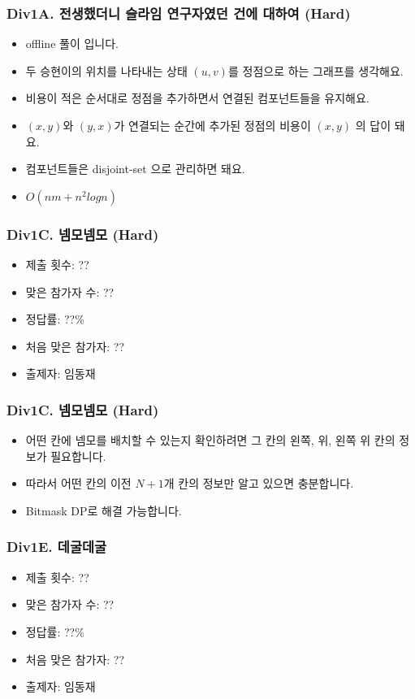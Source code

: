 \documentclass[xetex]{beamer}
\begin{document}
\begin{frame}
  \frametitle{Div1A. 전생했더니 슬라임 연구자였던 건에 대하여 (Hard)}
  \begin{itemize}
    \item offline 풀이 입니다.
    \item 두 승현이의 위치를 나타내는 상태 $(u, v)$를 정점으로 하는 그래프를 생각해요.
    \item 비용이 적은 순서대로 정점을 추가하면서 연결된 컴포넌트들을 유지해요.
    \item $(x, y)$와 $(y, x)$가 연결되는 순간에 추가된 정점의 비용이 $(x, y)$ 의 답이 돼요.
    \item 컴포넌트들은 disjoint-set 으로 관리하면 돼요.
    \item $O(n m + n^{2} log{n})$
  \end{itemize}
\end{frame}

\begin{frame}
  \frametitle{Div1C. 넴모넴모 (Hard)}
  \begin{itemize}
    \item 제출 횟수: ??
    \item 맞은 참가자 수: ??
    \item 정답률: ??\%
    \item 처음 맞은 참가자: ??
    \item 출제자: 임동재
  \end{itemize}
\end{frame}

\begin{frame}
  \frametitle{Div1C. 넴모넴모 (Hard)}
  \begin{itemize}
    \item 어떤 칸에 넴모를 배치할 수 있는지 확인하려면 그 칸의 왼쪽, 위, 왼쪽 위 칸의 정보가 필요합니다.
    \item 따라서 어떤 칸의 이전 $N + 1$개 칸의 정보만 알고 있으면 충분합니다.
    \item Bitmask DP로 해결 가능합니다.
  \end{itemize}
\end{frame}

\begin{frame}
  \frametitle{Div1E. 데굴데굴}
  \begin{itemize}
    \item 제출 횟수: ??
    \item 맞은 참가자 수: ??
    \item 정답률: ??\%
    \item 처음 맞은 참가자: ??
    \item 출제자: 임동재
  \end{itemize}
\end{frame}
\end{document}
